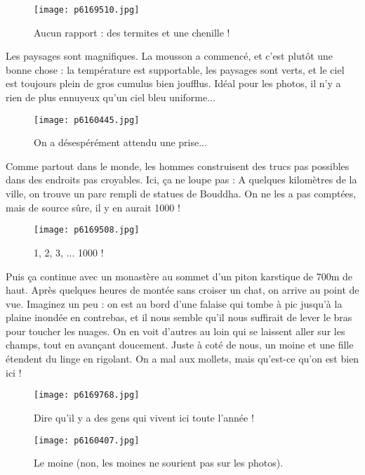 \documentclass{book}
\begin{document}
\begin{figure}[h]
\centering
\texttt{[image: p6169510.jpg]}
\caption*{Aucun rapport : des termites et une chenille !}
\end{figure}

Les paysages sont magnifiques. La mousson a commencé, et c'est plutôt une bonne chose : la température est supportable, les paysages sont verts, et le ciel est toujours plein de gros cumulus bien joufflus. Idéal pour les photos, il n'y a rien de plus ennuyeux qu'un ciel bleu uniforme...


\begin{figure}[h]
\centering
\texttt{[image: p6160445.jpg]}
\caption*{On a désespérément attendu une prise...}
\end{figure}

Comme partout dans le monde, les hommes construisent des trucs pas possibles dans des endroits pas croyables. Ici, ça ne loupe pas : A quelques kilomètres de la ville, on trouve un parc rempli de statues de Bouddha. On ne les a pas comptées, mais de source sûre, il y en aurait 1000 !


\begin{figure}[h]
\centering
\texttt{[image: p6169508.jpg]}
\caption*{1, 2, 3, ... 1000 !}
\end{figure}

Puis ça continue avec un monastère au sommet d'un piton karstique de 700m de haut. Après quelques heures de montée sans croiser un chat, on arrive au point de vue. Imaginez un peu : on est au bord d'une falaise qui tombe à pic jusqu'à la plaine inondée en contrebas, et il nous semble qu'il nous suffirait de lever le bras pour toucher les nuages. On en voit d'autres au loin qui se laissent aller sur les champs, tout en avançant doucement. Juste à coté de nous, un moine et une fille étendent du linge en rigolant. On a mal aux mollets, mais qu'est-ce qu'on est bien ici !


\begin{figure}[h]
\centering
\texttt{[image: p6169768.jpg]}
\caption*{Dire qu'il y a des gens qui vivent ici toute l'année !}
\end{figure}


\begin{figure}[h]
\centering
\texttt{[image: p6160407.jpg]}
\caption*{Le moine (non, les moines ne sourient pas sur les photos).}
\end{figure}
\end{document}

